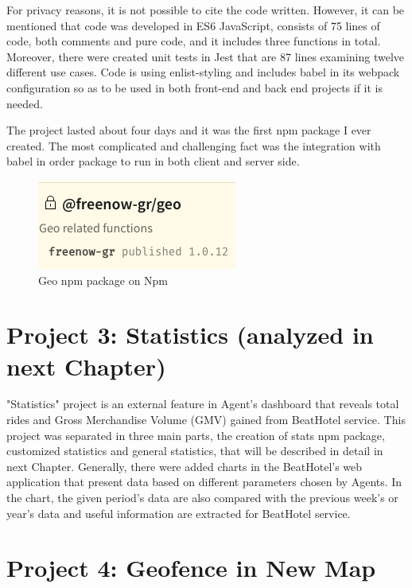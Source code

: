 For privacy reasons, it is not possible to cite the code written. However, it can be mentioned that code was developed in ES6 JavaScript, consists of 75 lines of code, both comments and pure code, and it includes three functions in total. Moreover, there were created unit tests in Jest that are 87 lines examining twelve different use cases. Code is using enlist-styling and includes babel in its webpack configuration so as to be used in both front-end and back end projects if it is needed. \par

The project lasted about four days and it was the first npm package I ever created. The most complicated and challenging fact was the integration with babel in order package to run in both client and server side. \par 

\begin{figure}[H]
	\begin{center}
		\includegraphics[scale=0.85]{images/my_projects/geo_npm-package.png}
	\end{center}
	\caption{Geo npm package on Npm}
\end{figure}

\section{Project 3: Statistics (analyzed in next Chapter)}

"Statistics" project is an external feature in Agent's dashboard that reveals total rides and Gross Merchandise Volume (GMV) gained from BeatHotel service. This project was separated in three main parts, the creation of stats npm package, customized statistics and general statistics, that will be described in detail in next Chapter. Generally, there were added charts in the BeatHotel's web application that present data based on different parameters chosen by Agents. In the chart, the given period's data are also compared with the previous week's or year's data and useful information are extracted for BeatHotel service.

\section{Project 4: Geofence in New Map}

